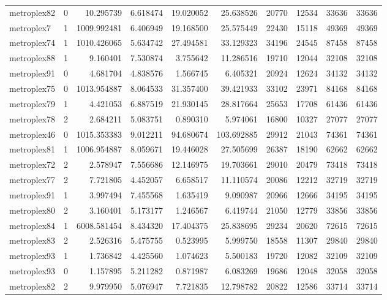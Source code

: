 \begin{longtable}{|l|r|r|r|r|r|r|r|r|r|}
metroplex82 & 0 & 10.295739 & 6.618474 & 19.020052 & 25.638526 & 20770 & 12534 & 33636 & 33636 \\
metroplex7 & 1 & 1009.992481 & 6.406949 & 19.168500 & 25.575449 & 22430 & 15118 & 49369 & 49369 \\
metroplex74 & 1 & 1010.426065 & 5.634742 & 27.494581 & 33.129323 & 34196 & 24545 & 87458 & 87458 \\
metroplex88 & 1 & 9.160401 & 7.530874 & 3.755642 & 11.286516 & 19710 & 12044 & 32108 & 32108 \\
metroplex91 & 0 & 4.681704 & 4.838576 & 1.566745 & 6.405321 & 20924 & 12624 & 34132 & 34132 \\
metroplex75 & 0 & 1013.954887 & 8.064533 & 31.357400 & 39.421933 & 33102 & 23971 & 84168 & 84168 \\
metroplex79 & 1 & 4.421053 & 6.887519 & 21.930145 & 28.817664 & 25653 & 17708 & 61436 & 61436 \\
metroplex78 & 2 & 2.684211 & 5.083751 & 0.890310 & 5.974061 & 16800 & 10327 & 27077 & 27077 \\
metroplex46 & 0 & 1015.353383 & 9.012211 & 94.680674 & 103.692885 & 29912 & 21043 & 74361 & 74361 \\
metroplex81 & 1 & 1006.954887 & 8.059671 & 19.446028 & 27.505699 & 26387 & 18190 & 62662 & 62662 \\
metroplex72 & 2 & 2.578947 & 7.556686 & 12.146975 & 19.703661 & 29010 & 20479 & 73418 & 73418 \\
metroplex77 & 2 & 7.721805 & 4.452057 & 6.658517 & 11.110574 & 20086 & 12212 & 32719 & 32719 \\
metroplex91 & 1 & 3.997494 & 7.455568 & 1.635419 & 9.090987 & 20966 & 12666 & 34195 & 34195 \\
metroplex80 & 2 & 3.160401 & 5.173177 & 1.246567 & 6.419744 & 21050 & 12779 & 33856 & 33856 \\
metroplex84 & 1 & 6008.581454 & 8.434320 & 17.404375 & 25.838695 & 29234 & 20620 & 72615 & 72615 \\
metroplex83 & 2 & 2.526316 & 5.475755 & 0.523995 & 5.999750 & 18558 & 11307 & 29840 & 29840 \\
metroplex93 & 1 & 1.736842 & 4.425560 & 1.074623 & 5.500183 & 19720 & 12082 & 32109 & 32109 \\
metroplex93 & 0 & 1.157895 & 5.211282 & 0.871987 & 6.083269 & 19686 & 12048 & 32058 & 32058 \\
metroplex82 & 2 & 9.979950 & 5.076947 & 7.721835 & 12.798782 & 20822 & 12586 & 33714 & 33714 \\

\end{longtable}

